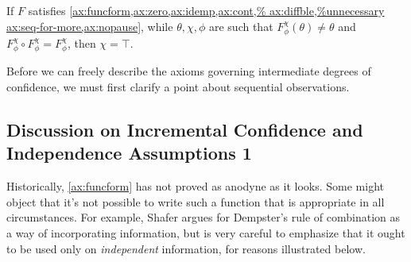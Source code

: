 \begin{subappendices}

    \begin{prop}
    	If $F$ satisfies
    	\cref{ax:funcform,ax:zero,ax:idemp,ax:cont,%
    		ax:diffble,%
    		ax:seq-for-more,ax:nopause},
    	while
     	$\theta,\chi,\phi$ are such that 
    	$F_\phi^\chi(\theta) \ne \theta$
    	and
    	$F^\chi_\phi \circ F^\chi_\phi = F^\chi_\phi$, then $\chi=\top$. 
    \end{prop}

    Before we can freely describe the axioms governing
    intermediate degrees of confidence, we must
    first clarify a point about sequential observations.


    \subsection{Discussion on Incremental Confidence and Independence Assumptions 1}
    	\label{ssec:indep-shafer}

    Historically, \cref{ax:funcform} has not proved as anodyne as it looks.
    Some might object that it's not possible to write such a function that is appropriate in all circumstances.
    For example, Shafer argues for Dempster's rule of combination as a way of incorporating information, but is very careful to emphasize that it ought to be used only on \emph{independent} information, for reasons illustrated below.




\end{subappendices}
